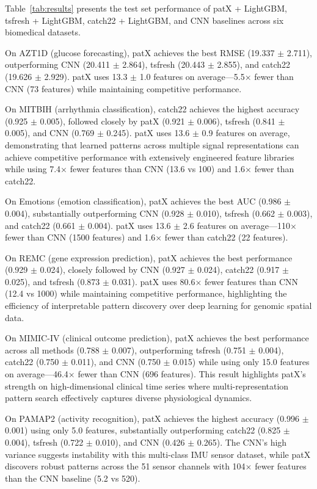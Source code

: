 \documentclass[11pt]{article}
\begin{document}


Table~\ref{tab:results} presents the test set performance of patX + LightGBM,
tsfresh + LightGBM, catch22 + LightGBM, and CNN baselines across six biomedical
datasets.

On AZT1D (glucose forecasting), patX achieves the best RMSE (19.337 $\pm$ 2.711),
outperforming CNN (20.411 $\pm$ 2.864), tsfresh (20.443 $\pm$ 2.855), and
catch22 (19.626 $\pm$ 2.929).
patX uses 13.3 $\pm$ 1.0 features on average---5.5× fewer than CNN (73 features)
while maintaining competitive performance.

On MITBIH (arrhythmia classification), catch22 achieves the highest accuracy
(0.925 $\pm$ 0.005), followed closely by patX (0.921 $\pm$ 0.006), tsfresh
(0.841 $\pm$ 0.005), and CNN (0.769 $\pm$ 0.245).
patX uses 13.6 $\pm$ 0.9 features on average, demonstrating that learned patterns
across multiple signal representations can achieve competitive performance
with extensively engineered feature libraries while using 7.4× fewer features
than CNN (13.6 vs 100) and 1.6× fewer than catch22.

On Emotions (emotion classification), patX achieves the best AUC
(0.986 $\pm$ 0.004), substantially outperforming CNN (0.928 $\pm$ 0.010),
tsfresh (0.662 $\pm$ 0.003), and catch22 (0.661 $\pm$ 0.004).
patX uses 13.6 $\pm$ 2.6 features on average---110× fewer than CNN (1500 features)
and 1.6× fewer than catch22 (22 features).

On REMC (gene expression prediction), patX achieves the best performance
(0.929 $\pm$ 0.024), closely followed by CNN (0.927 $\pm$ 0.024), catch22
(0.917 $\pm$ 0.025), and tsfresh (0.873 $\pm$ 0.031).
patX uses 80.6× fewer features than CNN (12.4 vs 1000) while maintaining
competitive performance, highlighting the efficiency of interpretable pattern
discovery over deep learning for genomic spatial data.

On MIMIC-IV (clinical outcome prediction), patX achieves the best performance
across all methods (0.788 $\pm$ 0.007), outperforming tsfresh (0.751 $\pm$ 0.004),
catch22 (0.750 $\pm$ 0.011), and CNN (0.750 $\pm$ 0.015) while using
only 15.0 features on average---46.4× fewer than CNN (696 features).
This result highlights patX's strength on high-dimensional clinical time series
where multi-representation pattern search effectively captures diverse
physiological dynamics.

On PAMAP2 (activity recognition), patX achieves the highest accuracy
(0.996 $\pm$ 0.001) using only 5.0 features, substantially outperforming
catch22 (0.825 $\pm$ 0.004), tsfresh (0.722 $\pm$ 0.010), and CNN
(0.426 $\pm$ 0.265).
The CNN's high variance suggests instability with this multi-class IMU sensor
dataset, while patX discovers robust patterns across the 51 sensor channels with
104× fewer
features than the CNN baseline (5.2 vs 520).
\end{document}
